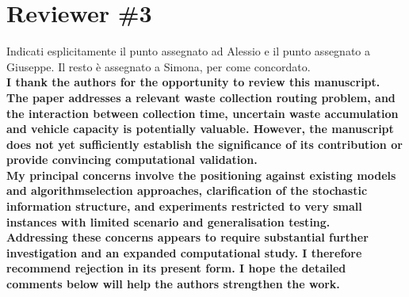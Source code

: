 \documentclass[11pt]{article}
\begin{document}
\newpage
	\section*{Reviewer \#3}
	\vspace{3mm}
Indicati esplicitamente il punto assegnato ad Alessio e il punto assegnato a Giuseppe. Il resto è assegnato a Simona, per come concordato.\\

\vspace{2mm}
\noindent\textbf{I thank the authors for the opportunity to review this manuscript. The paper addresses a
relevant waste collection routing problem, and the interaction between collection time,
uncertain waste accumulation and vehicle capacity is potentially valuable. However, the
manuscript does not yet sufficiently establish the significance of its contribution or
provide convincing computational validation.\\
My principal concerns involve the positioning against existing models and algorithmselection
approaches, clarification of the stochastic information structure, and
experiments restricted to very small instances with limited scenario and generalisation
testing.\\
Addressing these concerns appears to require substantial further investigation and an
expanded computational study. I therefore recommend rejection in its present form. I hope the detailed comments below will help the authors strengthen the work.}
\end{document}
